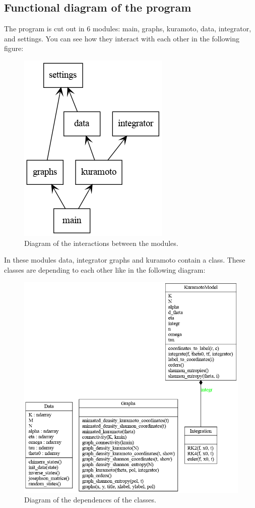 \documentclass[1pt, a4paper]{article}
\begin{document}
\subsection{Functional diagram of the program}
\label{subs:2.4}
The program is cut out in 6 modules: main, graphs, kuramoto, data, integrator, and settings. You can see how they interact with each other in the following figure:
\begin{figure}[htbp]
    \centering
    \includegraphics[scale=0.6]{figures/packages_kuramotoModel.png}
    \caption{Diagram of the interactions between the modules.}
    \label{fig:diagram_module}
\end{figure}
In these modules data, integrator graphs and kuramoto contain a class. These classes are depending to each other like in the following diagram:
\begin{figure}[htbp]
    \centering
    \includegraphics[scale=0.5]{figures/classes_kuramotoModel.png}
    \caption{Diagram of the dependences of the classes.}
    \label{fig:diagram_classes}
\end{figure}

\newpage


\end{document}
